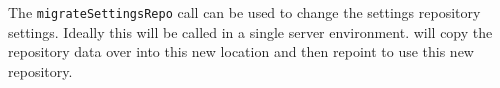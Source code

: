 The \verb+migrateSettingsRepo+ call can be used to change the settings repository settings. Ideally this will be
called in a single server environment. \Rapture will copy the repository data over into this new location and then
repoint to use this new repository.
